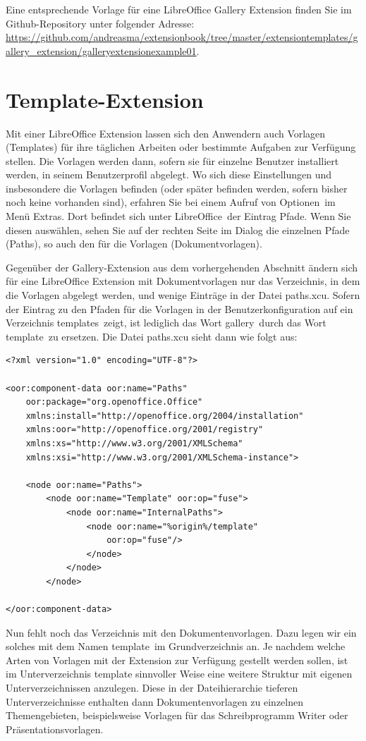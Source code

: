 \documentclass[a4paper,10pt,pagesize,titlepage]{scrbook}
\begin{document}
Eine entsprechende Vorlage für eine LibreOffice Gallery Extension finden Sie im Github-Repository unter folgender Adresse:
\url{https://github.com/andreasma/extensionbook/tree/master/extensiontemplates/gallery_extension/galleryextensionexample01}.

\section{Template-Extension}

Mit einer LibreOffice Extension lassen sich den Anwendern auch Vorlagen (Templates) für ihre täglichen Arbeiten oder bestimmte Aufgaben zur Verfügung stellen. Die Vorlagen werden dann, sofern sie für einzelne Benutzer installiert werden, in seinem Benutzerprofil abgelegt. Wo sich diese Einstellungen und insbesondere die Vorlagen befinden (oder später befinden werden, sofern bisher noch keine vorhanden sind), erfahren Sie bei einem Aufruf von \glqq Optionen\grqq~im Menü \glqq Extras\grqq. Dort befindet sich unter \glqq LibreOffice\grqq~der Eintrag \glqq Pfade\grqq. Wenn Sie diesen auswählen, sehen Sie auf der rechten Seite im Dialog die einzelnen Pfade (Paths), so auch den für die Vorlagen (\glqq Dokumentvorlagen\grqq).

Gegenüber der Gallery-Extension aus dem vorhergehenden Abschnitt ändern sich für  eine LibreOffice Extension mit Dokumentvorlagen nur das Verzeichnis, in dem die Vorlagen abgelegt werden, und wenige Einträge in der Datei \glqq paths.xcu\grqq. Sofern der Eintrag zu den Pfaden für die Vorlagen in der Benutzerkonfiguration auf ein Verzeichnis \glqq templates\grqq~zeigt, ist lediglich das Wort \glqq gallery\grqq~durch das Wort \glqq template\grqq~zu ersetzen. Die Datei paths.xcu sieht dann wie folgt aus:

\begin{lstlisting}
<?xml version="1.0" encoding="UTF-8"?>

<oor:component-data oor:name="Paths" 
    oor:package="org.openoffice.Office" 
    xmlns:install="http://openoffice.org/2004/installation" 
    xmlns:oor="http://openoffice.org/2001/registry"
    xmlns:xs="http://www.w3.org/2001/XMLSchema" 
    xmlns:xsi="http://www.w3.org/2001/XMLSchema-instance">

    <node oor:name="Paths">
        <node oor:name="Template" oor:op="fuse">
            <node oor:name="InternalPaths">
                <node oor:name="%origin%/template" 
                    oor:op="fuse"/>
                </node>
            </node>
        </node>

</oor:component-data>
\end{lstlisting}
Nun fehlt noch das Verzeichnis mit den Dokumentenvorlagen. Dazu legen wir ein solches mit dem Namen \glqq template\grqq~im Grundverzeichnis an. Je nachdem welche Arten von Vorlagen mit der Extension zur Verfügung gestellt werden sollen, ist im Unterverzeichnis template sinnvoller Weise eine weitere Struktur mit eigenen Unterverzeichnissen anzulegen. Diese in der Dateihierarchie tieferen Unterverzeichnisse enthalten dann Dokumentenvorlagen zu einzelnen Themengebieten, beispielsweise Vorlagen für das Schreibprogramm Writer oder Präsentationsvorlagen.
\end{document}
